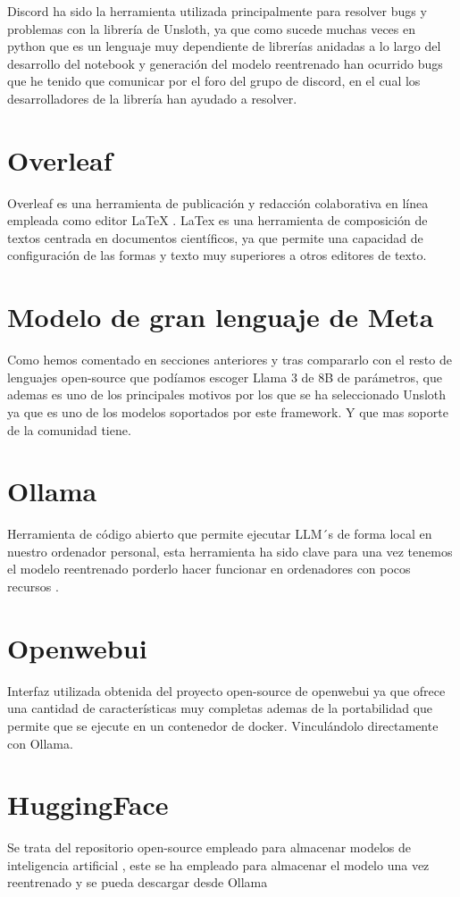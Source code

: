 Discord ha sido la herramienta utilizada principalmente para resolver bugs y problemas con la librería de Unsloth\cite{Unsloth}, ya que como sucede muchas veces en python que es un lenguaje muy dependiente de librerías anidadas a lo largo del desarrollo del notebook y generación del modelo reentrenado han ocurrido bugs que he tenido que comunicar por el foro del grupo de discord, en el cual los desarrolladores de la librería han ayudado a resolver.

\section{Overleaf}

Overleaf es una herramienta de publicación y redacción colaborativa en línea empleada como editor LaTeX \cite{overleaf}. LaTex es una herramienta de composición de textos centrada en documentos científicos, ya que permite una capacidad de configuración de las formas y texto muy superiores a otros editores de texto.

\section {Modelo de gran lenguaje de Meta}

Como hemos comentado en secciones anteriores y tras compararlo con el resto de lenguajes open-source que podíamos escoger Llama 3 de 8B \cite{llama} de parámetros, que ademas es uno de los principales motivos por los que se ha seleccionado Unsloth ya que es uno de los modelos soportados por este framework. Y que mas soporte de la comunidad tiene.

\section{Ollama}
\label{sec:ollama}
Herramienta de código abierto que permite ejecutar LLM´s de forma local en nuestro ordenador personal, esta herramienta ha sido clave para una vez tenemos el modelo reentrenado porderlo hacer funcionar en ordenadores con pocos recursos \cite{Ollama}.


\section {Openwebui}
\label{sec:Openwebui}
Interfaz utilizada obtenida del proyecto open-source de openwebui\cite{openwebui} ya que ofrece una cantidad de características muy completas ademas de la portabilidad que permite que se ejecute en un contenedor de docker. Vinculándolo directamente con Ollama.

\section{HuggingFace}
\label{sec:HuggingFace}
Se trata del repositorio open-source empleado para almacenar modelos de inteligencia artificial \cite{HuggingFace}, este se ha empleado para almacenar el modelo una vez reentrenado y se pueda descargar desde Ollama \cite{Ollama}





